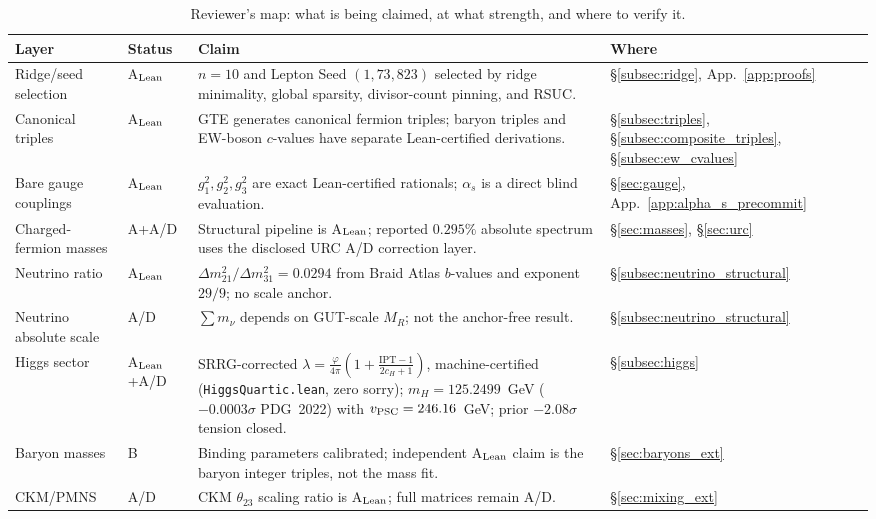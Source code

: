 \documentclass[11pt]{article}
\theoremstyle{remark}
\begin{document}
\begin{table}[H]
\centering
\caption{Reviewer's map: what is being claimed, at what strength, and where to verify it.}
\label{tab:reviewer_map}
\small
\renewcommand{\arraystretch}{1.18}
\begin{tabularx}{\linewidth}{@{}p{2.7cm}p{1.8cm}X p{2.2cm}@{}}
\toprule
\textbf{Layer} & \textbf{Status} & \textbf{Claim} & \textbf{Where} \\
\midrule
Ridge/seed selection & A$_{\rm Lean}$ & $n=10$ and Lepton Seed $(1,73,823)$ selected by ridge minimality, global sparsity, divisor-count pinning, and RSUC. & \S\ref{subsec:ridge}, App.~\ref{app:proofs} \\
Canonical triples & A$_{\rm Lean}$ & GTE generates canonical fermion triples; baryon triples and EW-boson $c$-values have separate Lean-certified derivations. & \S\ref{subsec:triples}, \S\ref{subsec:composite_triples}, \S\ref{subsec:ew_cvalues} \\
Bare gauge couplings & A$_{\rm Lean}$ & $g_1^2,g_2^2,g_3^2$ are exact Lean-certified rationals; $\alpha_s$ is a direct blind evaluation. & \S\ref{sec:gauge}, App.~\ref{app:alpha_s_precommit} \\
Charged-fermion masses & A+A/D & Structural pipeline is A$_{\rm Lean}$; reported $0.295\%$ absolute spectrum uses the disclosed URC A/D correction layer. & \S\ref{sec:masses}, \S\ref{sec:urc} \\
Neutrino ratio & A$_{\rm Lean}$ & $\Delta m^2_{21}/\Delta m^2_{31}=0.0294$ from Braid Atlas $b$-values and exponent $29/9$; no scale anchor. & \S\ref{subsec:neutrino_structural} \\
Neutrino absolute scale & A/D & $\sum m_\nu$ depends on GUT-scale $M_R$; not the anchor-free result. & \S\ref{subsec:neutrino_structural} \\
Higgs sector & A$_{\rm Lean}$+A/D & SRRG-corrected $\lambda=\frac{\varphi}{4\pi}(1+\frac{\mathrm{IPT}-1}{2c_H+1})$, machine-certified (\texttt{HiggsQuartic.lean}, zero sorry); $m_H = 125.2499$~GeV ($-0.0003\sigma$ PDG~2022) with $v_{\rm PSC}=246.16$~GeV; prior $-2.08\sigma$ tension closed. & \S\ref{subsec:higgs} \\
Baryon masses & B & Binding parameters calibrated; independent A$_{\rm Lean}$ claim is the baryon integer triples, not the mass fit. & \S\ref{sec:baryons_ext} \\
CKM/PMNS & A/D & CKM $\theta_{23}$ scaling ratio is A$_{\rm Lean}$; full matrices remain A/D. & \S\ref{sec:mixing_ext} \\
\bottomrule
\end{tabularx}
\end{table}
\end{document}
